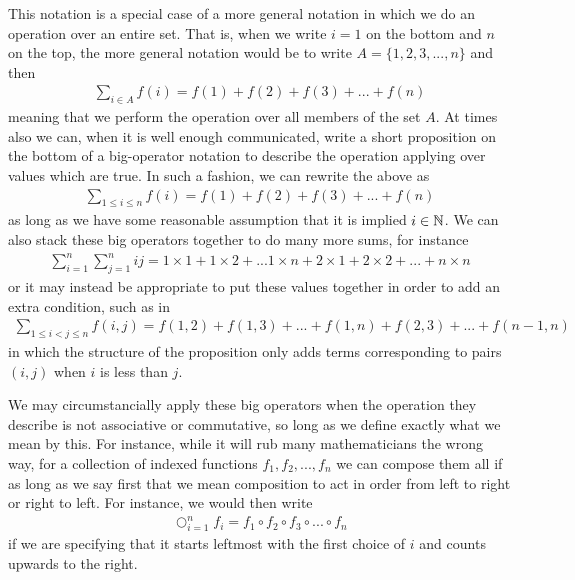 \documentclass[11pt]{article}
\begin{document}
This notation is a special case of a more general notation in which we do an operation over an entire set. That is, when we write $i=1$ on the bottom and $n$ on the top, the more general notation would be to write $A = \{1,2,3,...,n\}$ and then \begin{gather*}
\sum_{i \in A} f(i) = f(1) + f(2) + f(3) + ... + f(n)
\end{gather*}
meaning that we perform the operation over all members of the set $A$. At times also we can, when it is well enough communicated, write a short proposition on the bottom of a big-operator notation to describe the operation applying over values which are true. In such a fashion, we can rewrite the above as \begin{gather*}
\sum_{1\le i \le n} f(i) = f(1) + f(2) + f(3) + ... + f(n)
\end{gather*}
as long as we have some reasonable assumption that it is implied $i \in \mathbb{N}$. We can also stack these big operators together to do many more sums, for instance \begin{gather*}
\sum_{i = 1}^n \sum_{j=1}^n i j = 1 \times 1 + 1 \times 2 + ... 1 \times n + 2 \times 1 + 2 \times 2 + ... + n \times n
\end{gather*}
or it may instead be appropriate to put these values together in order to add an extra condition, such as in \begin{gather*}
\sum_{1 \le i < j \le n} f(i,j) = f(1,2) + f(1,3) + ... + f(1,n) + f(2,3) + ... + f(n-1,n)
\end{gather*}
in which the structure of the proposition only adds terms corresponding to pairs $(i,j)$ when $i$ is less than $j$.

We may circumstancially apply these big operators when the operation they describe is not associative or commutative, so long as we define exactly what we mean by this. For instance, while it will rub many mathematicians the wrong way, for a collection of indexed functions $f_1,f_2,..., f_n$ we can compose them all if as long as we say first that we mean composition to act in order from left to right or right to left. For instance, we would then write \begin{gather*}
\bigcirc_{i=1}^n f_i = f_1 \circ f_2 \circ f_3 \circ ... \circ f_n
\end{gather*}
if we are specifying that it starts leftmost with the first choice of $i$ and counts upwards to the right.
\end{document}
